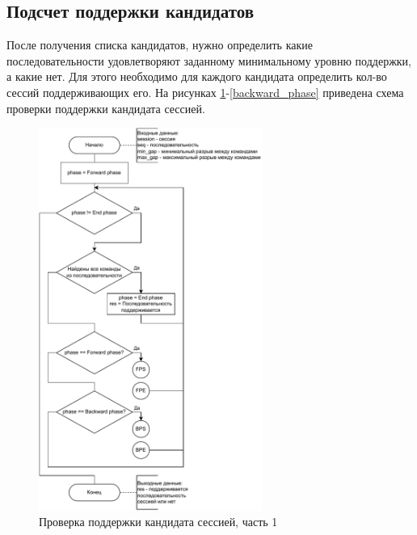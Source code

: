 
\newpage
\subsection{Подсчет поддержки кандидатов}

После получения списка кандидатов, нужно определить какие последовательности удовлетворяют заданному минимальному уровню поддержки, а какие нет. Для этого необходимо для каждого кандидата определить кол-во сессий поддерживающих его. На рисунках \ref{sessionSupportsSequence}-\ref{backward_phase} приведена схема проверки поддержки кандидата сессией.


\begin{figure}[h!]
	\centering
	\includegraphics[width=0.65\textwidth]{inc/img/sessionSupportsSequence2.drawio.pdf}
	\caption{Проверка поддержки кандидата сессией, часть 1}
	\label{sessionSupportsSequence}
\end{figure}

